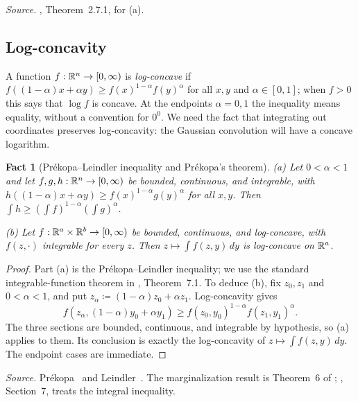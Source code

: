 \documentclass[11pt,letterpaper]{article}
\theoremstyle{plain}
\newtheorem{fact}{Fact}[section]
\begin{document}
\emph{Source.} , Theorem~2.7.1, for (a).

\subsection{Log-concavity}\label{tb:sec:logconcave}

A function \(f:\mathbb R^n\to[0,\infty)\) is \emph{log-concave} if
\(f((1-\alpha)x+\alpha y)\ge f(x)^{1-\alpha}f(y)^\alpha\) for all \(x,y\) and \(\alpha\in[0,1]\);
when \(f>0\) this says that \(\log f\) is concave. At the endpoints
\(\alpha=0,1\) the inequality means equality, without a convention
for \(0^0\). We need the fact that integrating out coordinates
preserves log-concavity: the Gaussian convolution will have a
concave logarithm.

\begin{fact}[Pr\'ekopa--Leindler inequality and Pr\'ekopa's theorem]
\label{tb:prekopa}
(a) Let \(0<\alpha<1\) and let \(f,g,h:\mathbb R^n\to[0,\infty)\) be bounded,
continuous, and integrable, with
\(h((1-\alpha)x+\alpha y)\ge f(x)^{1-\alpha}g(y)^\alpha\) for all \(x,y\). Then
\(\int h\ge(\int f)^{1-\alpha}(\int g)^\alpha\).

(b) Let \(f:\mathbb R^a\times\mathbb R^b\to[0,\infty)\) be bounded, continuous, and
log-concave, with \(f(z,\cdot)\) integrable for every \(z\). Then
\(z\mapsto\int f(z,y)\,dy\) is log-concave on \(\mathbb R^a\).
\end{fact}

\begin{proof}
Part (a) is the Pr\'ekopa--Leindler inequality; we use the standard
integrable-function theorem in , Theorem~7.1.
To deduce (b), fix \(z_0,z_1\) and \(0<\alpha<1\), and put
\(z_\alpha\coloneqq(1-\alpha)z_0+\alpha z_1\).
Log-concavity gives
\[
 f(z_\alpha,(1-\alpha)y_0+\alpha y_1)
 \ge f(z_0,y_0)^{1-\alpha}f(z_1,y_1)^\alpha.
\]
The three sections are bounded, continuous, and integrable by hypothesis,
so (a) applies to them. Its conclusion is exactly the log-concavity of
\(z\mapsto\int f(z,y)\,dy\). The endpoint cases are immediate.
\end{proof}

\emph{Source.} Pr\'ekopa~ and Leindler~.
The marginalization result is Theorem~6 of ;
, Section~7, treats the integral inequality.
\end{document}
